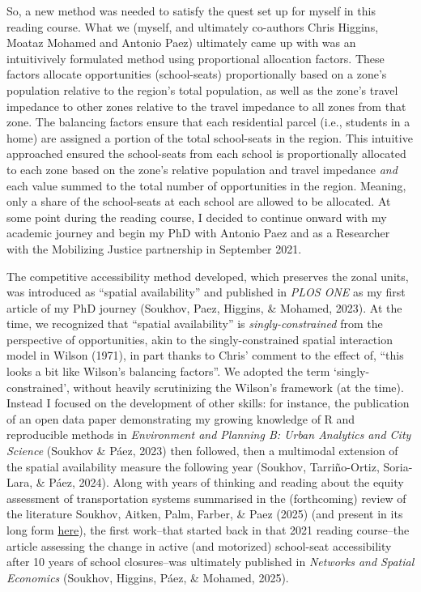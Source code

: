 \documentclass[
11pt, %
oneside, %
english, %
singlespacing, %
]{macthesis} %
\begin{document}
So, a new method was needed to satisfy the quest set up for myself in this reading course. What we (myself, and ultimately co-authors Chris Higgins, Moataz Mohamed and Antonio Paez) ultimately came up with was an intuitivively formulated method using proportional allocation factors. These factors allocate opportunities (school-seats) proportionally based on a zone's population relative to the region's total population, as well as the zone's travel impedance to other zones relative to the travel impedance to all zones from that zone. The balancing factors ensure that each residential parcel (i.e., students in a home) are assigned a portion of the total school-seats in the region. This intuitive approached ensured the school-seats from each school is proportionally allocated to each zone based on the zone's relative population and travel impedance \emph{and} each value summed to the total number of opportunities in the region. Meaning, only a share of the school-seats at each school are allowed to be allocated. At some point during the reading course, I decided to continue onward with my academic journey and begin my PhD with Antonio Paez and as a Researcher with the Mobilizing Justice partnership in September 2021.

The competitive accessibility method developed, which preserves the zonal units, was introduced as ``spatial availability'' and published in \emph{PLOS ONE} as my first article of my PhD journey (Soukhov, Paez, Higgins, \& Mohamed, 2023). At the time, we recognized that ``spatial availability'' is \emph{singly-constrained} from the perspective of opportunities, akin to the singly-constrained spatial interaction model in Wilson (1971), in part thanks to Chris' comment to the effect of, ``this looks a bit like Wilson's balancing factors''. We adopted the term `singly-constrained', without heavily scrutinizing the Wilson's framework (at the time). Instead I focused on the development of other skills: for instance, the publication of an open data paper demonstrating my growing knowledge of R and reproducible methods in \emph{Environment and Planning B: Urban Analytics and City Science} (Soukhov \& Páez, 2023) then followed, then a multimodal extension of the spatial availability measure the following year (Soukhov, Tarriño-Ortiz, Soria-Lara, \& Páez, 2024). Along with years of thinking and reading about the equity assessment of transportation systems summarised in the (forthcoming) review of the literature Soukhov, Aitken, Palm, Farber, \& Paez (2025) (and present in its long form \href{https://mobilizingjustice.ca/wp-content/uploads/2024/01/just-transportation-1.pdf}{here}), the first work--that started back in that 2021 reading course--the article assessing the change in active (and motorized) school-seat accessibility after 10 years of school closures--was ultimately published in \emph{Networks and Spatial Economics} (Soukhov, Higgins, Páez, \& Mohamed, 2025).
\end{document}
